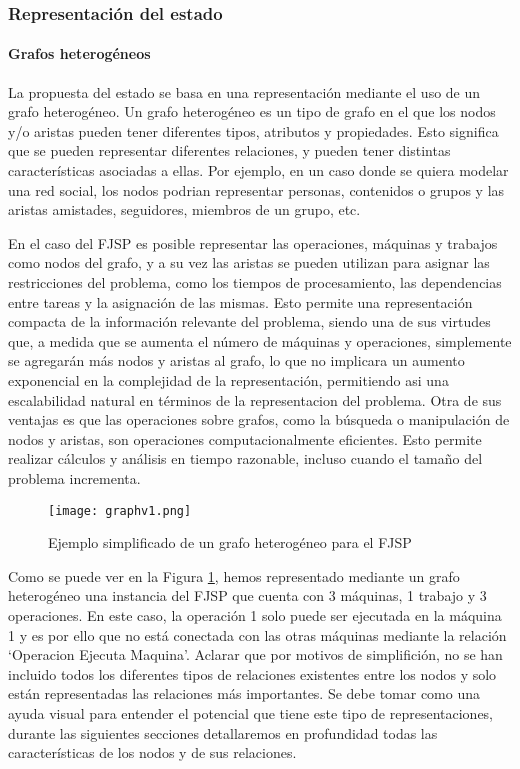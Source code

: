 \subsubsection{Representación del estado}
\paragraph{Grafos heterogéneos}
La propuesta del estado se basa en una representación mediante el uso de un grafo heterogéneo. Un grafo 
heterogéneo es un tipo de grafo en el que los nodos y/o aristas pueden tener diferentes tipos, atributos 
y propiedades. Esto significa que se pueden representar diferentes relaciones, y pueden tener distintas 
características asociadas a ellas. Por ejemplo, en un caso donde se quiera modelar una red social, 
los nodos podrian representar personas, contenidos o grupos y las aristas amistades, seguidores, 
miembros de un grupo, etc.\medskip 

En el caso del FJSP es posible representar las operaciones, máquinas y trabajos como nodos del grafo, 
y a su vez las aristas se pueden utilizan para asignar las restricciones del problema, como los tiempos de 
procesamiento, las dependencias entre tareas y la asignación de las mismas. Esto permite una representación 
compacta de la información relevante del problema, siendo una de sus virtudes que, a medida que se aumenta 
el número de máquinas y operaciones, simplemente se agregarán más nodos y aristas al grafo, lo que no 
implicara un aumento exponencial en la complejidad de la representación, permitiendo asi una escalabilidad 
natural en términos de la representacion del problema. Otra de sus ventajas es que las operaciones sobre 
grafos, como la búsqueda o manipulación de nodos y aristas, son operaciones computacionalmente eficientes. 
Esto permite realizar cálculos y análisis en tiempo razonable, incluso cuando el tamaño del problema incrementa. 

\begin{figure}[ht]
    \centering
    \texttt{[image: graphv1.png]}
    \caption{Ejemplo simplificado de un grafo heterogéneo para el FJSP}
    \label{fig:grafo-heterogeneo}
\end{figure}

Como se puede ver en la Figura \ref{fig:grafo-heterogeneo}, hemos representado mediante un grafo
heterogéneo una instancia del FJSP que cuenta con 3 máquinas, 1 trabajo y 3 operaciones. En este caso, 
la operación 1 solo puede ser ejecutada en la máquina 1 y es por ello que no está conectada con 
las otras máquinas mediante la relación `Operacion Ejecuta Maquina'. Aclarar que por motivos de 
simplifición, no se han incluido todos los diferentes tipos de relaciones existentes entre 
los nodos y solo están representadas las relaciones más importantes. Se debe tomar como una ayuda 
visual para entender el potencial que tiene este tipo de representaciones, durante las siguientes 
secciones detallaremos en profundidad todas las características de los nodos y de sus relaciones.

